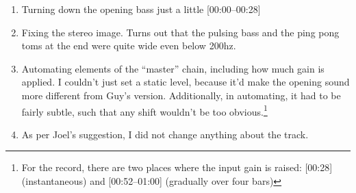   \begin{enumerate}
         \item Turning down the opening bass just a little [00:00--00:28]
         \item Fixing the stereo image. Turns out that the pulsing bass and the ping pong toms at the end were quite wide even below 200hz.
         \item Automating elements of the ``master'' chain, including how much gain is applied. I couldn't just set a static level, because it'd make the opening sound more different from Guy's version. Additionally, in automating, it had to be fairly subtle, such that any shift wouldn't be too obvious.\footnote{For the record, there are two places where the input gain is raised: [00:28] (instantaneous) and [00:52--01:00] (gradually over four bars)}
         \item As per Joel's suggestion, I did not change anything about the track.
  \end{enumerate}
